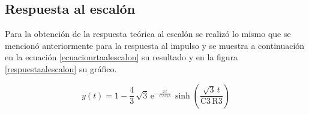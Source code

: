 \subsection{Respuesta al escalón}










Para la obtención de la respuesta teórica al escalón se realizó lo mismo que se mencionó anteriormente para la respuesta al impulso y se muestra a continuación en la ecuación \ref{ecuacionrtaalescalon} su resultado y en la figura \ref{respuestaalescalon} su gráfico.

\begin{equation}
y \! \left(t\right) = 1 - \dfrac{4}{3}\, \sqrt{3}\, \mathrm{e}^{-\frac{2\, t}{\mathrm{C3}\, \mathrm{R3}}}\, \sinh\!\left(\dfrac{\sqrt{3}\, t}{\mathrm{C3}\, \mathrm{R3}}\right)
\label{ecuacionrtaalescalon}
\end{equation}

